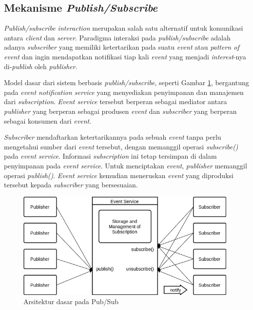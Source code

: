 \subsection{Mekanisme \textit{Publish/Subscribe}}
\label{ssec:pub-sub-mechanism}
\textit{Publish/subscribe interaction} merupakan salah satu alternatif untuk komunikasi antara \textit{client} dan \textit{server}. Paradigma interaksi pada \textit{publish/subscribe} adalah adanya \textit{subscriber} yang memiliki ketertarikan pada suatu \textit{event} atau \textit{pattern of event} dan ingin mendapatkan notifikasi tiap kali \textit{event} yang menjadi \textit{interest}-nya di-\textit{publish} oleh \textit{publisher}.


Model dasar dari sistem berbasis \textit{publish/subscribe}, seperti Gambar \ref{fig:pub-sub-general}, bergantung pada \textit{event notification service} yang menyediakan penyimpanan dan manajemen dari \textit{subscription}. \textit{Event service} tersebut berperan sebagai mediator antara \textit{publisher} yang berperan sebagai produsen \textit{event} dan \textit{subscriber} yang berperan sebagai konsumen dari \textit{event}. 


\textit{Subscriber} mendaftarkan ketertarikannya pada sebuah \textit{event} tanpa perlu mengetahui sumber dari \textit{event} tersebut, dengan memanggil operasi \textit{subscribe()} pada \textit{event service}. Informasi \textit{subscription} ini tetap tersimpan di dalam penyimpanan pada \textit{event service}. Untuk menciptakan \textit{event}, \textit{publisher} memanggil operasi \textit{publish()}. \textit{Event service} kemudian meneruskan \textit{event} yang diproduksi tersebut kepada \textit{subscriber} yang bersesuaian.


\begin{figure}[!]
	\centering
	\includegraphics[width=11cm]{Resources/Images/pub-sub-general}
	\caption{Arsitektur dasar pada Pub/Sub \citep{eugster_many_2003}}
	\label{fig:pub-sub-general}
\end{figure}


